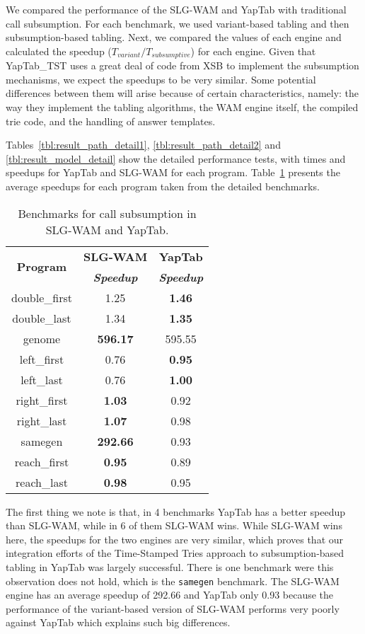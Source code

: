 We compared the performance of the SLG-WAM and YapTab with traditional call subsumption.
For each benchmark, we used variant-based tabling and then subsumption-based tabling.
Next, we compared the values of each engine and calculated the speedup ($T_{variant} / T_{subsumptive}$) for
each engine. Given that YapTab\_TST uses a great deal of code from XSB to implement the subsumption mechanisms,
we expect the speedups to be very similar. Some potential differences between them will arise because
of certain characteristics, namely: the way they implement the tabling algorithms, the WAM engine itself,
the compiled trie code, and the handling of answer templates.

Tables~\ref{tbl:result_path_detail1}, \ref{tbl:result_path_detail2} and \ref{tbl:result_model_detail}
show the detailed performance tests, with times and speedups for YapTab and SLG-WAM for each program.
Table~\ref{tbl:results_overview} presents the average speedups for each program taken from the
detailed benchmarks.

\begin{table}[ht]
\centering
  \begin{tabular}{ccc}
   \hline
    \hline
    \multirow{2}{*}{\textbf{Program}} & \textbf{SLG-WAM} & \textbf{YapTab} \\
    & \textbf{\textit{\small{Speedup}}} & \textbf{\textit{\small{Speedup}}} \\
   \hline
   \hline
double\_first & 1.25 & \textbf{1.46} \\
double\_last & 1.34 & \textbf{1.35} \\
genome & \textbf{596.17} & 595.55 \\
left\_first & 0.76 & \textbf{0.95} \\
left\_last & 0.76  & \textbf{1.00} \\
right\_first & \textbf{1.03} & 0.92 \\
right\_last & \textbf{1.07} & 0.98 \\
samegen & \textbf{292.66} & 0.93 \\
reach\_first  & \textbf{0.95} & 0.89 \\
reach\_last  & \textbf{0.98} & 0.95 \\
\hline
\hline
\end{tabular}
\caption{Benchmarks for call subsumption in SLG-WAM and YapTab.}
\label{tbl:results_overview}
\end{table}

The first thing we note is that, in 4 benchmarks
YapTab has a better speedup than SLG-WAM, while in 6 of them SLG-WAM wins. While SLG-WAM wins here,
the speedups for the two engines are very similar, which proves that our integration
efforts of the Time-Stamped Tries approach to subsumption-based tabling in YapTab was largely successful.
There is one benchmark were this observation does not hold, which is the \texttt{samegen} benchmark.
The SLG-WAM engine has an average speedup of 292.66 and YapTab only 0.93 because the performance
of the variant-based version of SLG-WAM performs very poorly against YapTab which explains such big differences.

